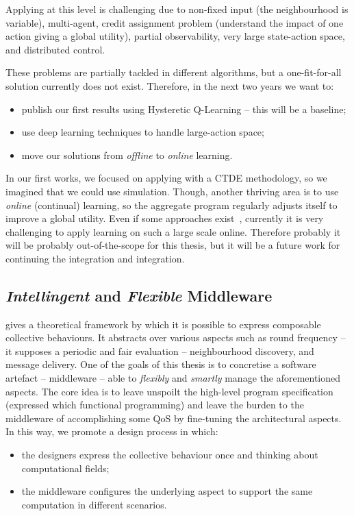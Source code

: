 \documentclass[11pt]{article}
\begin{document}
Applying \rl{} at this level is challenging due to non-fixed input (the neighbourhood is variable), multi-agent, credit assignment problem (understand the impact of one action giving a global utility), partial observability, very large state-action space, and distributed control.

These problems are partially tackled in different \marl{} algorithms, but a one-fit-for-all solution currently does not exist. Therefore, in the next two years we want to:
\begin{itemize}
	\item publish our first results using Hysteretic Q-Learning -- this will be a baseline;
	\item use deep learning techniques to handle large-action space;
	\item move our solutions from \emph{offline} to \emph{online} learning. 
\end{itemize}
In our first works, we focused on applying \rl{} with a CTDE methodology, so we imagined that we could use simulation.
Though, another thriving area is to use \emph{online} (continual) learning, so the aggregate program regularly adjusts itself to improve a global utility. Even if some approaches exist~\cite{DBLP:conf/icml/OmidshafieiPAHV17}, currently it is very challenging to apply learning on such a large scale online. Therefore probably it will be probably out-of-the-scope for this thesis, but it will be a future work for continuing the integration \ac{} and \rl{} integration. 
\subsection{\emph{Intellingent} and \emph{Flexible} Middleware}\label{middleware}
\ac{} gives a theoretical framework by which it is possible to express composable collective behaviours. It abstracts over various aspects such as round frequency -- it supposes a periodic and fair evaluation -- neighbourhood discovery, and message delivery.
One of the goals of this thesis is to concretise a software artefact -- middleware -- able to \emph{flexibly} and \emph{smartly} manage the aforementioned aspects.
%
The core idea is to leave unspoilt the high-level program specification (expressed which functional programming) and leave the burden to the middleware of accomplishing some QoS by fine-tuning the architectural aspects. 
%
In this way, we promote a design process in which:
\begin{itemize}
	\item the designers express the collective behaviour once and thinking about computational fields;
	\item the middleware configures the underlying aspect to support the same computation in different scenarios.
\end{itemize}
\end{document}
